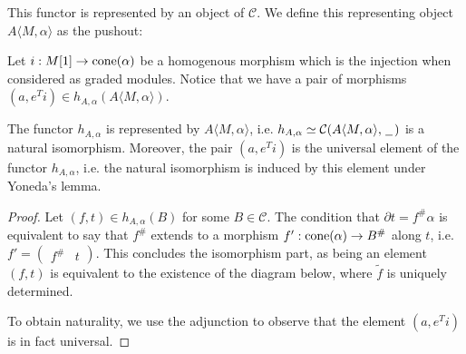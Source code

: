 \documentclass[../thesis.tex]{subfiles}
\begin{document}
            This functor is represented by an object of $\mathcal{C}$. We define this representing object $A\langle M, \alpha\rangle$ as the pushout:
            \begin{center}
            \end{center}
            Let $i: M[1] \rightarrow \tt{cone}(\alpha)$ be a homogenous morphism which is the injection when considered as graded modules. Notice that we have a pair of morphisms $(a, e^Ti)\in h_{A,\alpha}(A\langle M,\alpha\rangle)$.
                
            \begin{proposition}\label{prop: universal-h}
                The functor $h_{A,\alpha}$ is represented by $A\langle M,\alpha\rangle$, i.e. $h_{A,\alpha}\simeq \mathcal{C}(A\langle M,\alpha\rangle,\argument)$ is a natural isomorphism. Moreover, the pair $(a,e^Ti)$ is the universal element of the functor $h_{A,\alpha}$, i.e. the natural isomorphism is induced by this element under Yoneda's lemma.
            \end{proposition}

            \begin{proof}
                Let $(f,t)\in h_{A,\alpha}(B)$ for some $B\in\mathcal{C}$. The condition that $\partial t = f^\#\alpha$ is equivalent to say that $f^\#$ extends to a morphism $f' : \tt{cone}(\alpha) \rightarrow B^\#$ along $t$, i.e. $f' = \begin{pmatrix}f^\# & t\end{pmatrix}$. This concludes the isomorphism part, as being an element $(f,t)$ is equivalent to the existence of the diagram below, where $\widetilde{f}$ is uniquely determined.
                \begin{center}
                \end{center}
  
                To obtain naturality, we use the adjunction to observe that the element $(a, e^Ti)$ is in fact universal.
            \end{proof}
\end{document}
